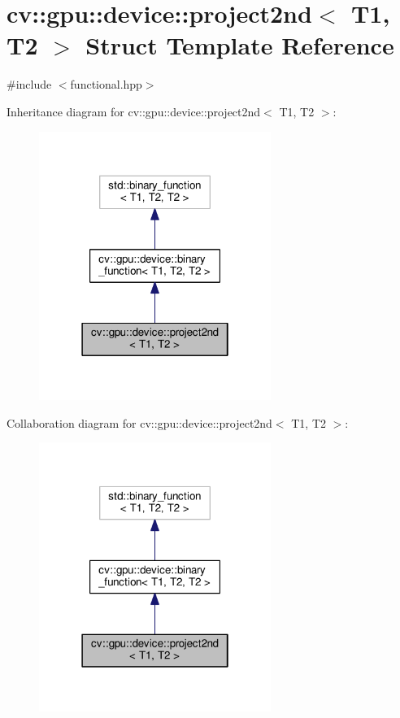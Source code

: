 \hypertarget{structcv_1_1gpu_1_1device_1_1project2nd}{\section{cv\-:\-:gpu\-:\-:device\-:\-:project2nd$<$ T1, T2 $>$ Struct Template Reference}
\label{structcv_1_1gpu_1_1device_1_1project2nd}
}


{\ttfamily \#include $<$functional.\-hpp$>$}



Inheritance diagram for cv\-:\-:gpu\-:\-:device\-:\-:project2nd$<$ T1, T2 $>$\-:\nopagebreak
\begin{figure}[H]
\begin{center}
\leavevmode
\includegraphics[width=214pt]{structcv_1_1gpu_1_1device_1_1project2nd__inherit__graph}
\end{center}
\end{figure}


Collaboration diagram for cv\-:\-:gpu\-:\-:device\-:\-:project2nd$<$ T1, T2 $>$\-:\nopagebreak
\begin{figure}[H]
\begin{center}
\leavevmode
\includegraphics[width=214pt]{structcv_1_1gpu_1_1device_1_1project2nd__coll__graph}
\end{center}
\end{figure}
